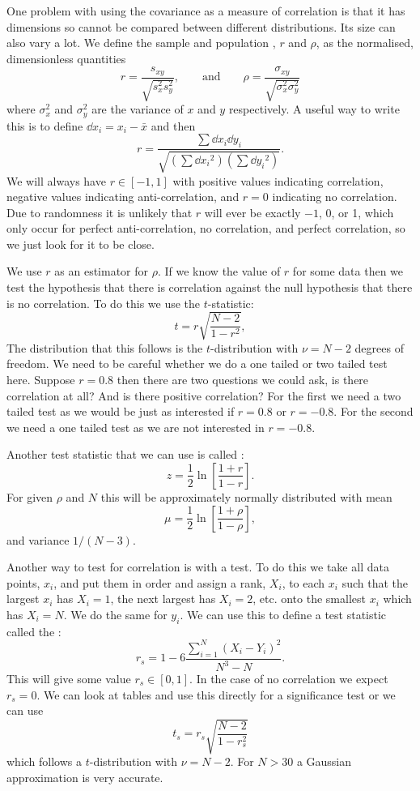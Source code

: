 \documentclass[a4paper]{article}
\begin{document}
    One problem with using the covariance as a measure of correlation is that it has dimensions so cannot be compared between different distributions.
    Its size can also vary a lot.
    We define the sample and population , \(r\) and \(\rho\), as the normalised, dimensionless quantities
    \[r = \frac{s_{xy}}{\sqrt{s_x^2s_y^2}}, \qquad\text{and}\qquad \rho = \frac{\sigma_{xy}}{\sqrt{\sigma_x^2\sigma_y^2}}\]
    where \(\sigma_x^2\) and \(\sigma_y^2\) are the variance of \(x\) and \(y\) respectively.
    A useful way to write this is to define \(\dd{x_i} = x_i - \bar{x}\) and then
    \[r = \frac{\sum \dd{x_i}\dd{y_i}}{\sqrt{\left(\sum\dd{x_i}^2\right)\left(\sum\dd{y_i}^2\right)}}.\]
    We will always have \(r \in [-1, 1]\) with positive values indicating correlation, negative values indicating anti-correlation, and \(r = 0\) indicating no correlation.
    Due to randomness it is unlikely that \(r\) will ever be exactly \(-1\), 0, or 1, which only occur for perfect anti-correlation, no correlation, and perfect correlation, so we just look for it to be close.
    
    We use \(r\) as an estimator for \(\rho\).
    If we know the value of \(r\) for some data then we test the hypothesis that there is correlation against the null hypothesis that there is no correlation.
    To do this we use the \(t\)-statistic:
    \[t = r\sqrt{\frac{N - 2}{1 - r^2}},\]
    The distribution that this follows is the \(t\)-distribution with \(\nu = N - 2\) degrees of freedom.
    We need to be careful whether we do a one tailed or two tailed test here.
    Suppose \(r = 0.8\) then there are two questions we could ask, is there correlation at all? And is there positive correlation?
    For the first we need a two tailed test as we would be just as interested if \(r = 0.8\) or \(r = -0.8\).
    For the second we need a one tailed test as we are not interested in \(r = -0.8\).
    
    Another test statistic that we can use is called :
    \[z = \frac{1}{2}\ln\left[\frac{1 + r}{1 - r}\right].\]
    For given \(\rho\) and \(N\) this will be approximately normally distributed with mean
    \[\mu = \frac{1}{2}\ln\left[\frac{1 + \rho}{1 - \rho}\right],\]
    and variance \(1 / (N - 3)\).
    
    Another way to test for correlation is with a  test.
    To do this we take all data points, \(x_i\), and put them in order and assign a rank, \(X_i\), to each \(x_i\) such that the largest \(x_i\) has \(X_i = 1\), the next largest has \(X_i = 2\), etc. onto the smallest \(x_i\) which has \(X_i = N\).
    We do the same for \(y_i\).
    We can use this to define a test statistic called the :
    \[r_s = 1 - 6\frac{\sum_{i=1}^{N}(X_i - Y_i)^2}{N^3 - N}.\]
    This will give some value \(r_s \in[0, 1]\).
    In the case of no correlation we expect \(r_s = 0\).
    We can look at tables and use this directly for a significance test or we can use
    \[t_s = r_s \sqrt{\frac{N - 2}{1 - r_s^2}}\]
    which follows a \(t\)-distribution with \(\nu = N - 2\).
    For \(N > 30\) a Gaussian approximation is very accurate.
    
\end{document}
